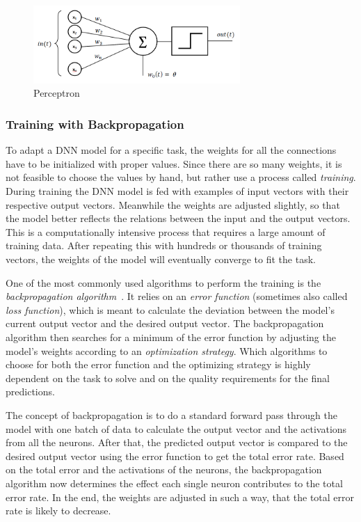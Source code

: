 \begin{figure}[h]
    \centering
    \includegraphics[width=0.7\textwidth]{images/perceptron}
    \caption{Perceptron}
    \label{fig:perceptron}
\end{figure}

\subsubsection{Training with Backpropagation}
To adapt a DNN model for a specific task, the weights for all the connections have to be initialized with proper values. Since there are so many weights, it is not feasible to choose the values by hand, but rather use a process called \emph{training}. During training the DNN model is fed with examples of input vectors with their respective output vectors. Meanwhile the weights are adjusted slightly, so that the model better reflects the relations between the input and the output vectors. This is a computationally intensive process that requires a large amount of training data. After repeating this with hundreds or thousands of training vectors, the weights of the model will eventually converge to fit the task.

One of the most commonly used algorithms to perform the training is the \emph{backpropagation algorithm}~\cite[pp.~151ff]{nn_intro96}. It relies on an \emph{error function} (sometimes also called \emph{loss function}), which is meant to calculate the deviation between the model's current output vector and the desired output vector. The backpropagation algorithm then searches for a minimum of the error function by adjusting the model's weights according to an \emph{optimization strategy}. Which algorithms to choose for both the error function and the optimizing strategy is highly dependent on the task to solve and on the quality requirements for the final predictions.

The concept of backpropagation is to do a standard forward pass through the model with one batch of data to calculate the output vector and the activations from all the neurons. After that, the predicted output vector is compared to the desired output vector using the error function to get the total error rate. Based on the total error and the activations of the neurons, the backpropagation algorithm now determines the effect each single neuron contributes to the total error rate. In the end, the weights are adjusted in such a way, that the total error rate is likely to decrease.


